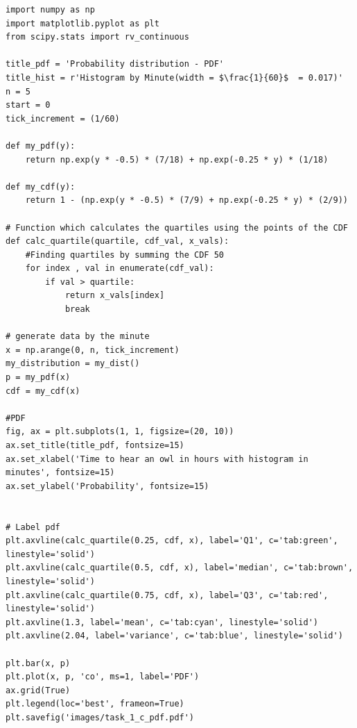 \begin{lstlisting}[caption={Plotting the PDF and histogram)},label={lst:code_task_1_c}]
import numpy as np
import matplotlib.pyplot as plt
from scipy.stats import rv_continuous

title_pdf = 'Probability distribution - PDF'
title_hist = r'Histogram by Minute(width = $\frac{1}{60}$  = 0.017)'
n = 5
start = 0
tick_increment = (1/60)

def my_pdf(y):
    return np.exp(y * -0.5) * (7/18) + np.exp(-0.25 * y) * (1/18)

def my_cdf(y):
    return 1 - (np.exp(y * -0.5) * (7/9) + np.exp(-0.25 * y) * (2/9))

# Function which calculates the quartiles using the points of the CDF
def calc_quartile(quartile, cdf_val, x_vals):
    #Finding quartiles by summing the CDF 50
    for index , val in enumerate(cdf_val):
        if val > quartile:
            return x_vals[index]
            break

# generate data by the minute
x = np.arange(0, n, tick_increment)
my_distribution = my_dist()
p = my_pdf(x)
cdf = my_cdf(x)

#PDF
fig, ax = plt.subplots(1, 1, figsize=(20, 10))
ax.set_title(title_pdf, fontsize=15)
ax.set_xlabel('Time to hear an owl in hours with histogram in minutes', fontsize=15)
ax.set_ylabel('Probability', fontsize=15)


# Label pdf
plt.axvline(calc_quartile(0.25, cdf, x), label='Q1', c='tab:green', linestyle='solid')
plt.axvline(calc_quartile(0.5, cdf, x), label='median', c='tab:brown', linestyle='solid')
plt.axvline(calc_quartile(0.75, cdf, x), label='Q3', c='tab:red', linestyle='solid')
plt.axvline(1.3, label='mean', c='tab:cyan', linestyle='solid')
plt.axvline(2.04, label='variance', c='tab:blue', linestyle='solid')

plt.bar(x, p)
plt.plot(x, p, 'co', ms=1, label='PDF')
ax.grid(True)
plt.legend(loc='best', frameon=True)
plt.savefig('images/task_1_c_pdf.pdf')
\end{lstlisting}


